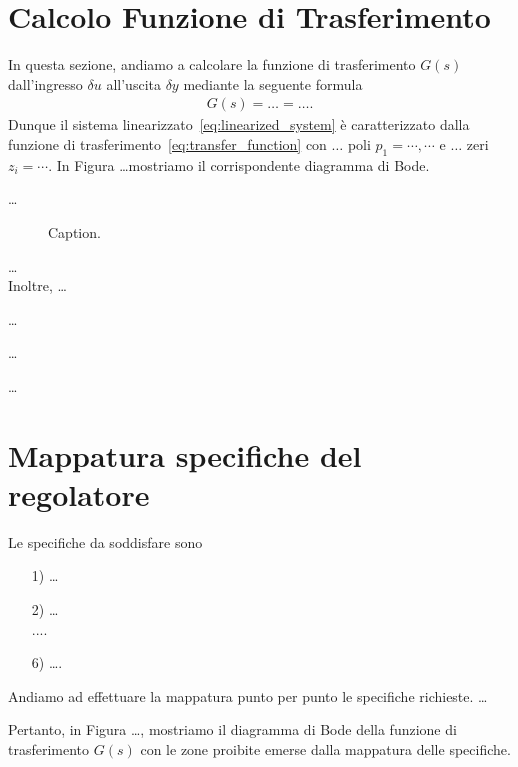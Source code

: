 \documentclass[a4paper, 11pt]{article}
\begin{document}
\section{Calcolo Funzione di Trasferimento}

In questa sezione, andiamo a calcolare la funzione di trasferimento $G(s)$ dall'ingresso $\delta u$ all'uscita $\delta y$ mediante la seguente formula 
%
%
\begin{align}\label{eq:transfer_function}
G(s) = \dots = \dots.
\end{align}
%
Dunque il sistema linearizzato~\eqref{eq:linearized_system} è caratterizzato dalla funzione di trasferimento~\eqref{eq:transfer_function} con $\dots$ poli $p_1 = \cdots, \cdots$ e $\dots$ zeri $z_i =\cdots$. In Figura \dots mostriamo il corrispondente diagramma di Bode.

\dots

\begin{figure}[h]
    \centering
    \caption{Caption.}
    \label{fig:bode_diagram}
\end{figure}

\dots\\

Inoltre, \dots

\dots

\dots

\dots


\section{Mappatura specifiche del regolatore}
\label{sec:specifications}

Le specifiche da soddisfare sono
\begin{itemize}
	\item[1)] \dots\\
	\item[2)] \dots\\
	....\\
	\item[6)] \dots.
\end{itemize}
%
Andiamo ad effettuare la mappatura punto per punto le specifiche richieste. \dots  

Pertanto, in Figura \dots, mostriamo il diagramma di Bode della funzione di trasferimento $G(s)$ con le zone proibite emerse dalla mappatura delle specifiche.
\end{document}
